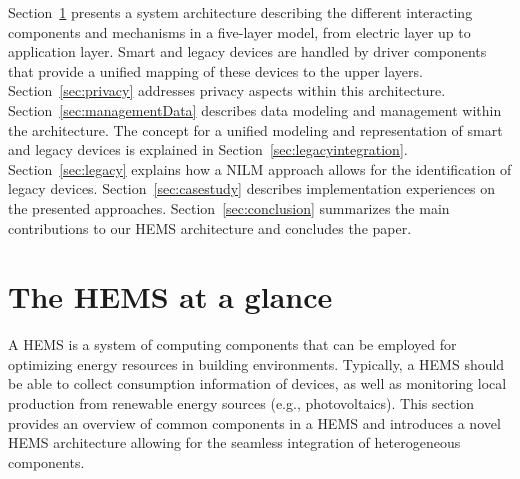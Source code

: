 \documentclass{article}
\begin{document}
Section~\ref{sec:section2} presents a system architecture describing the different interacting components and mechanisms in a five-layer model, from electric layer up to application layer. Smart and legacy devices are handled by driver components that provide a unified mapping of these devices to the upper layers. Section~\ref{sec:privacy} addresses privacy aspects within this architecture. Section~\ref{sec:managementData} describes data modeling and management within the architecture. The concept for a unified modeling and representation of smart and legacy devices is explained in Section~\ref{sec:legacyintegration}. Section~\ref{sec:legacy} explains how a \ac{NILM} approach allows for the identification of legacy devices. 
Section~\ref{sec:casestudy} describes implementation experiences on the presented approaches. Section~\ref{sec:conclusion} summarizes the main contributions to our \ac{HEMS} architecture and concludes the paper.















\section{The \ac{HEMS} at a glance} \label{sec:section2}
A \ac{HEMS} is a system of computing components that can be employed for optimizing energy resources in building environments.
Typically, a HEMS should be able to collect consumption information of devices, as well as monitoring local production from renewable energy sources (e.g., photovoltaics).
This section provides an overview of common components in a \ac{HEMS} and introduces a novel \ac{HEMS} architecture allowing for the seamless integration of heterogeneous components.
\end{document}
